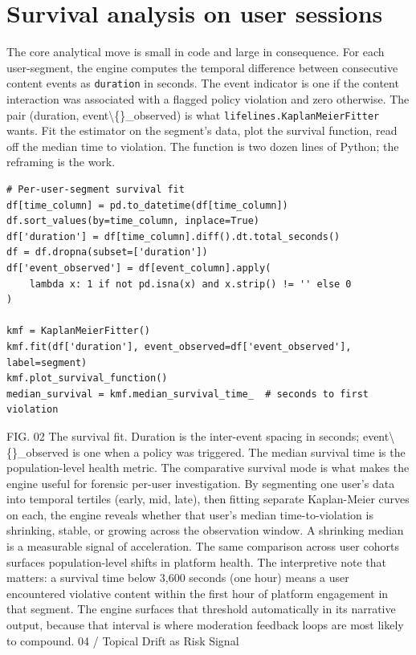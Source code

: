 \documentclass{obelus-preprint}
\begin{document}
\section{Survival analysis on user sessions}
The core analytical move is small in code and large in consequence. For each user-segment, the engine computes the temporal difference between consecutive content events as \texttt{duration} in seconds. The event indicator is one if the content interaction was associated with a flagged policy violation and zero otherwise. The pair (duration, event\textbackslash\{\}\_observed) is what \texttt{lifelines.KaplanMeierFitter} wants. Fit the estimator on the segment's data, plot the survival function, read off the median time to violation. The function is two dozen lines of Python; the reframing is the work.
\begin{verbatim}
# Per-user-segment survival fit
df[time_column] = pd.to_datetime(df[time_column])
df.sort_values(by=time_column, inplace=True)
df['duration'] = df[time_column].diff().dt.total_seconds()
df = df.dropna(subset=['duration'])
df['event_observed'] = df[event_column].apply(
    lambda x: 1 if not pd.isna(x) and x.strip() != '' else 0
)

kmf = KaplanMeierFitter()
kmf.fit(df['duration'], event_observed=df['event_observed'], label=segment)
kmf.plot_survival_function()
median_survival = kmf.median_survival_time_  # seconds to first violation
\end{verbatim}
FIG. 02 The survival fit. Duration is the inter-event spacing in seconds; event\textbackslash\{\}\_observed is one when a policy was triggered. The median survival time is the population-level health metric.
The comparative survival mode is what makes the engine useful for forensic per-user investigation. By segmenting one user's data into temporal tertiles (early, mid, late), then fitting separate Kaplan-Meier curves on each, the engine reveals whether that user's median time-to-violation is shrinking, stable, or growing across the observation window. A shrinking median is a measurable signal of acceleration. The same comparison across user cohorts surfaces population-level shifts in platform health.
The interpretive note that matters: a survival time below 3,600 seconds (one hour) means a user encountered violative content within the first hour of platform engagement in that segment. The engine surfaces that threshold automatically in its narrative output, because that interval is where moderation feedback loops are most likely to compound.
04 / Topical Drift as Risk Signal
\end{document}

